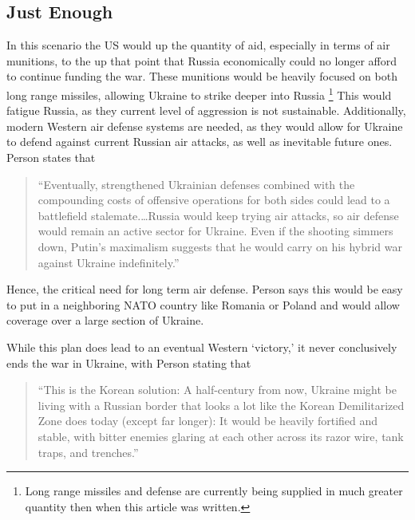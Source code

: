 \documentclass{article}
\begin{document}
    \subsection{Just Enough}

        In this scenario the US would up the quantity of aid, especially in terms of air munitions, to the up that point that Russia economically could no longer afford to continue funding the war. These munitions would be heavily focused on both long range missiles, allowing Ukraine to strike deeper into Russia \footnote{Long range missiles and defense are currently being supplied in much greater quantity then when this article was written.} This would fatigue Russia, as they current level of aggression is not sustainable. Additionally, modern Western air defense systems are needed, as they would allow for Ukraine to defend against current Russian air attacks, as well as inevitable future ones. Person states that 
        
        \begin{quote}
            ``Eventually, strengthened Ukrainian defenses combined with the compounding costs of offensive operations for both sides could lead to a battlefield stalemate.\ldots Russia would keep trying air attacks, so air defense would remain an active sector for Ukraine. Even if the shooting simmers down, Putin's maximalism suggests that he would carry on his hybrid war against Ukraine indefinitely.'' \parencite{person_2025}
        \end{quote}

        Hence, the critical need for long term air defense. Person says this would be easy to put in a neighboring NATO country like Romania or Poland and would allow coverage over a large section of Ukraine.
        
        While this plan does lead to an eventual Western `victory,' it never conclusively ends the war in Ukraine, with Person stating that 

        \begin{quote}
            ``This is the Korean solution: A half-century from now, Ukraine might be living with a Russian border that looks a lot like the Korean Demilitarized Zone does today (except far longer): It would be heavily fortified and stable, with bitter enemies glaring at each other across its razor wire, tank traps, and trenches.'' \parencite{person_2025}
        \end{quote}
\end{document}

